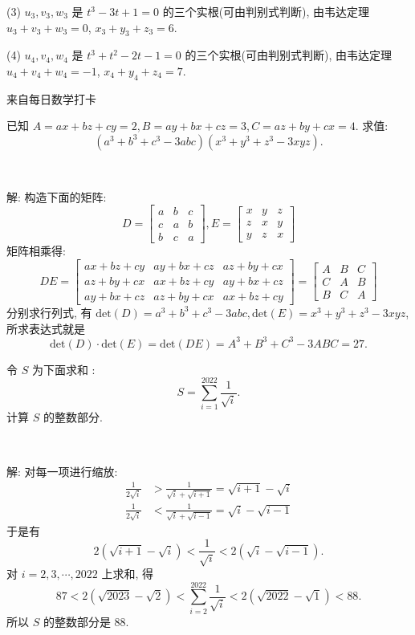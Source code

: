 (3) $u_3, v_3, w_3$ 是 $t^3-3t+1=0$ 的三个实根(可由判别式判断), 由韦达定理 $u_3+v_3+w_3 = 0$, $x_3+y_3+z_3 = 6$.

(4) $u_4, v_4, w_4$ 是 $t^3+t^2-2t-1=0$ 的三个实根(可由判别式判断), 由韦达定理 $u_4+v_4+w_4 = -1$, $x_4+y_4+z_4 = 7$.


\newpage
\noindent 来自每日数学打卡

已知 $A = ax + bz + cy = 2, B = ay + bx + cz = 3, C = az + by + cx = 4$. 求值:
\[(a^3+b^3+c^3-3abc)(x^3+y^3+z^3-3xyz) .\]

~

解: 构造下面的矩阵:
\[
D = \begin{bmatrix}
a & b & c \\
c & a & b \\
b & c & a
\end{bmatrix}, 
E = \begin{bmatrix}
x & y & z \\
z & x & y \\
y & z & x
\end{bmatrix}
\]
矩阵相乘得:
\[
DE = \begin{bmatrix}
ax+bz+cy & ay+bx+cz & az+by+cx \\
az+by+cx & ax+bz+cy & ay+bx+cz \\
ay+bx+cz & az+by+cx & ax+bz+cy 
\end{bmatrix} = 
\begin{bmatrix}
A & B & C\\
C & A & B\\
B & C & A 
\end{bmatrix}
\]
分别求行列式, 有 $\mathrm{det}(D) = a^3 + b^3 + c^3 - 3abc, \mathrm{det}(E) = x^3+y^3+z^3-3xyz$, 所求表达式就是 
\[ \mathrm{det}(D)\cdot\mathrm{det}(E) = \mathrm{det}(DE) = A^3+B^3+C^3-3ABC = 27 . \]


\newpage

令 $S$ 为下面求和 :
\[S = \sum_{i=1}^{2022}{\frac{1}{\sqrt{i}}} .\]
计算 $S$ 的整数部分.

~

解: 对每一项进行缩放:
\begin{align*}
\frac{1}{2\sqrt{i}} &> \frac{1}{\sqrt{i}+\sqrt{i+1}} = \sqrt{i+1}-\sqrt{i} \\
\frac{1}{2\sqrt{i}} &< \frac{1}{\sqrt{i}+\sqrt{i-1}} = \sqrt{i}-\sqrt{i-1}
\end{align*}
于是有
\[2(\sqrt{i+1} - \sqrt{i}) < \frac{1}{\sqrt{i}} < 2(\sqrt{i} - \sqrt{i - 1}) .\]
对 $i=2,3,\cdots,2022$ 上求和, 得
\[87 < 2(\sqrt{2023} - \sqrt{2}) < \sum_{i=2}^{2022}{\frac{1}{\sqrt{i}}} < 2(\sqrt{2022} - \sqrt{1}) < 88 .\]
所以 $S$ 的整数部分是 88.



